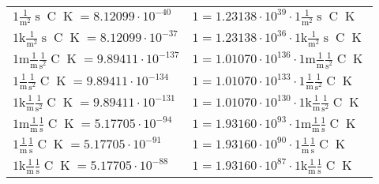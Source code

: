 \begin{center}
\begin{longtable}{l l}
{\color{black}$1 \bm{\mathrm{ }}\frac1{\operatorname{m}^2}{\operatorname{s}}{\operatorname{C}}{\operatorname{K}} = 8.12099\cdot10^{-40} $}   & {\color{black}$ 1 = 1.23138\cdot10^{39} \cdot 1 \bm{\mathrm{ }}\frac1{\operatorname{m}^2}{\operatorname{s}}{\operatorname{C}}{\operatorname{K}}$}  \\
{\color{gray}$1 \bm{\mathrm{ k}}\frac1{\operatorname{m}^2}{\operatorname{s}}{\operatorname{C}}{\operatorname{K}} = 8.12099\cdot10^{-37} $}   & {\color{gray}$ 1 = 1.23138\cdot10^{36} \cdot 1 \bm{\mathrm{ k}}\frac1{\operatorname{m}^2}{\operatorname{s}}{\operatorname{C}}{\operatorname{K}}$}  \\
{\color{gray}$1 \bm{\mathrm{ m}}\frac1{\operatorname{m}}\frac1{\operatorname{s}^2}{\operatorname{C}}{\operatorname{K}} = 9.89411\cdot10^{-137} $}   & {\color{gray}$ 1 = 1.01070\cdot10^{136} \cdot 1 \bm{\mathrm{ m}}\frac1{\operatorname{m}}\frac1{\operatorname{s}^2}{\operatorname{C}}{\operatorname{K}}$}  \\
{\color{black}$1 \bm{\mathrm{ }}\frac1{\operatorname{m}}\frac1{\operatorname{s}^2}{\operatorname{C}}{\operatorname{K}} = 9.89411\cdot10^{-134} $}   & {\color{black}$ 1 = 1.01070\cdot10^{133} \cdot 1 \bm{\mathrm{ }}\frac1{\operatorname{m}}\frac1{\operatorname{s}^2}{\operatorname{C}}{\operatorname{K}}$}  \\
{\color{gray}$1 \bm{\mathrm{ k}}\frac1{\operatorname{m}}\frac1{\operatorname{s}^2}{\operatorname{C}}{\operatorname{K}} = 9.89411\cdot10^{-131} $}   & {\color{gray}$ 1 = 1.01070\cdot10^{130} \cdot 1 \bm{\mathrm{ k}}\frac1{\operatorname{m}}\frac1{\operatorname{s}^2}{\operatorname{C}}{\operatorname{K}}$}  \\
{\color{gray}$1 \bm{\mathrm{ m}}\frac1{\operatorname{m}}\frac1{\operatorname{s}}{\operatorname{C}}{\operatorname{K}} = 5.17705\cdot10^{-94} $}   & {\color{gray}$ 1 = 1.93160\cdot10^{93} \cdot 1 \bm{\mathrm{ m}}\frac1{\operatorname{m}}\frac1{\operatorname{s}}{\operatorname{C}}{\operatorname{K}}$}  \\
{\color{black}$1 \bm{\mathrm{ }}\frac1{\operatorname{m}}\frac1{\operatorname{s}}{\operatorname{C}}{\operatorname{K}} = 5.17705\cdot10^{-91} $}   & {\color{black}$ 1 = 1.93160\cdot10^{90} \cdot 1 \bm{\mathrm{ }}\frac1{\operatorname{m}}\frac1{\operatorname{s}}{\operatorname{C}}{\operatorname{K}}$}  \\
{\color{gray}$1 \bm{\mathrm{ k}}\frac1{\operatorname{m}}\frac1{\operatorname{s}}{\operatorname{C}}{\operatorname{K}} = 5.17705\cdot10^{-88} $}   & {\color{gray}$ 1 = 1.93160\cdot10^{87} \cdot 1 \bm{\mathrm{ k}}\frac1{\operatorname{m}}\frac1{\operatorname{s}}{\operatorname{C}}{\operatorname{K}}$}  \\

\end{longtable}
\end{center}
